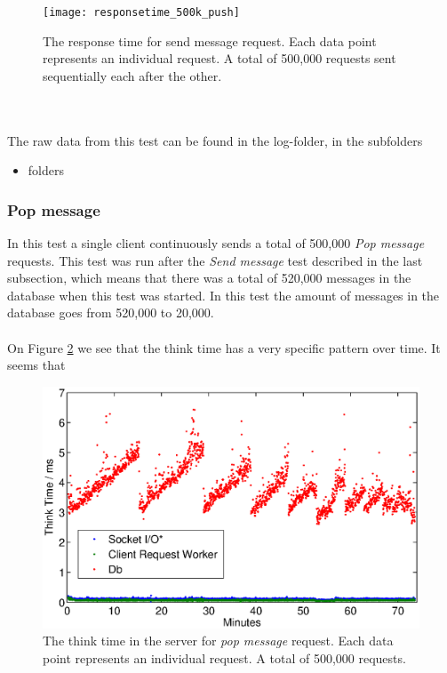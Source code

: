 \documentclass{article}
\begin{document}
                \begin{figure}[H]
                    \texttt{[image: responsetime\_500k\_push]}
                    \caption{The response time for send message request. Each data point represents an individual request. A total of 500,000 requests sent sequentially each after the other.}
                    \label{fig:responsetime_500k_push}
                \end{figure}
                ~\\
                \\
                The raw data from this test can be found in the log-folder, in the subfolders
                \begin{itemize}
                    \item folders
                \end{itemize}

            \subsubsection{Pop message}
                In this test a single client continuously sends a total of 500,000 \textit{Pop message} requests. This test was run after the \textit{Send message} test described in the last subsection, which means that there was a total of 520,000 messages in the database when this test was started. In this test the amount of messages in the database goes from 520,000 to 20,000.\\
                \\
                On Figure \ref{fig:thinktime_500k_pop} we see that the think time has a very specific pattern over time. It seems that 


                \begin{figure}[H]
                    \includegraphics[scale=0.50]{thinktime_500k_pop}
                    \caption{The think time in the server for \textit{pop message} request. Each data point represents an individual request. A total of 500,000 requests.}
                    \label{fig:thinktime_500k_pop}
                \end{figure}
\end{document}
